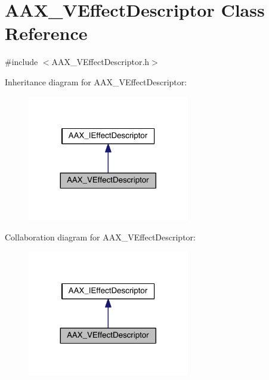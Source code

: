\hypertarget{a00134}{}\section{A\+A\+X\+\_\+\+V\+Effect\+Descriptor Class Reference}
\label{a00134}


{\ttfamily \#include $<$A\+A\+X\+\_\+\+V\+Effect\+Descriptor.\+h$>$}



Inheritance diagram for A\+A\+X\+\_\+\+V\+Effect\+Descriptor\+:
\nopagebreak
\begin{figure}[H]
\begin{center}
\leavevmode
\includegraphics[width=200pt]{a00698}
\end{center}
\end{figure}


Collaboration diagram for A\+A\+X\+\_\+\+V\+Effect\+Descriptor\+:
\nopagebreak
\begin{figure}[H]
\begin{center}
\leavevmode
\includegraphics[width=200pt]{a00699}
\end{center}
\end{figure}


